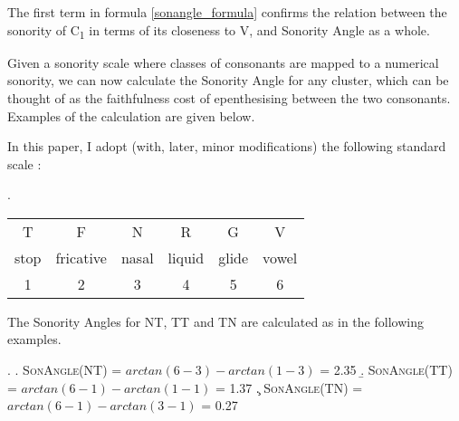 \documentclass[12pt]{article}
\begin{document}
\vspace{-9em}
\begin{center}
\end{center}

The first term in formula \ref{sonangle_formula} confirms the relation between the sonority of C\textsubscript{1} in terms of its closeness to V, and {\sc Sonority Angle} as a whole.

\bigskip

Given a sonority scale where classes of consonants are mapped to a numerical sonority, we can now calculate the {\sc Sonority Angle} for any cluster, which can be thought of as the faithfulness cost of epenthesising between the two consonants.  Examples of the calculation are given below.

In this paper, I adopt (with, later, minor modifications) the following standard scale \citep[(10)]{flemming.2008}:

\ex. \label{standardsonorityscale} 
      \begin{tabular}{cccccc}
         T & F & N & R & G & V \\
         stop & fricative & nasal & liquid & glide & vowel \\
         1 & 2 & 3 & 4 & 5 & 6 \\
      \end{tabular}

The {\sc Sonority Angles} for NT, TT and TN are calculated as in the following examples.

\ex. \a. \textsc{SonAngle}(NT) =  $arctan(6-3) - arctan(1-3)$ = 2.35
     \b. \textsc{SonAngle}(TT) =  $arctan(6-1) - arctan(1-1)$ = 1.37
     \c. \textsc{SonAngle}(TN) =  $arctan(6-1) - arctan(3-1)$ = 0.27
\end{document}
